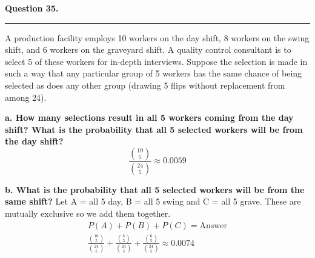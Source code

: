 \textbf{Question 35.} \\
\hrule 

A production facility employs 10 workers on the day shift, 8 workers on the swing shift, and 6 workers on the graveyard shift. A quality control consultant is to select 5 of these workers for in-depth interviews. Suppose the selection is made in such a way that any particular group of 5 workers has the same chance of being selected as does any other group (drawing 5 flips without replacement from among 24).

\textbf{a. How many selections result in all 5 workers coming from the day shift? What is the probability that all 5 selected workers will be from the day shift?} \newline
\[\frac{\binom{10}{5}}{\binom{24}{5}} \approx \boxed{0.0059}\]

\textbf{b. What is the probability that all 5 selected workers will be from the same shift?} \newline
Let A = all 5 day, B = all 5 swing and C = all 5 grave. These are mutually exclusive so we add them together.
\begin{align*}
    P(A) + P(B) + P(C) = \text{Answer} \\
    \frac{\binom{10}{5}}{\binom{24}{5}} + \frac{\binom{8}{5}}{\binom{24}{5}} + \frac{\binom{6}{5}}{\binom{24}{5}} \approx \boxed{0.0074}
\end{align*}